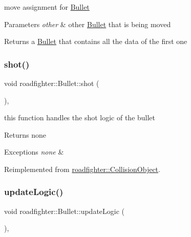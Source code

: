 move assignment for \hyperlink{classroadfighter_1_1Bullet}{Bullet} 
\begin{DoxyParams}{Parameters}
{\em other} & other \hyperlink{classroadfighter_1_1Bullet}{Bullet} that is being moved \\
\hline
\end{DoxyParams}
\begin{DoxyReturn}{Returns}
a \hyperlink{classroadfighter_1_1Bullet}{Bullet} that contains all the data of the first one 
\end{DoxyReturn}
\mbox{\label{classroadfighter_1_1Bullet_acaacd303f1f4e55c5029d4a4cbe1d9b1}} 
\subsubsection{\texorpdfstring{shot()}{shot()}}
{\footnotesize\ttfamily void roadfighter\+::\+Bullet\+::shot (\begin{DoxyParamCaption}{ }\end{DoxyParamCaption})\hspace{0.3cm}{\ttfamily [override]}, {\ttfamily [virtual]}}

this function handles the shot logic of the bullet \begin{DoxyReturn}{Returns}
none 
\end{DoxyReturn}

\begin{DoxyExceptions}{Exceptions}
{\em none} & \\
\hline
\end{DoxyExceptions}


Reimplemented from \hyperlink{classroadfighter_1_1CollisionObject_a55d891b6d9b50abdc44f964a40a7777c}{roadfighter\+::\+Collision\+Object}.

\mbox{\label{classroadfighter_1_1Bullet_a13aa730279ee8590d0eb2f9e6c01f265}} 
\subsubsection{\texorpdfstring{update\+Logic()}{updateLogic()}}
{\footnotesize\ttfamily void roadfighter\+::\+Bullet\+::update\+Logic (\begin{DoxyParamCaption}{ }\end{DoxyParamCaption})\hspace{0.3cm}{\ttfamily [override]}, {\ttfamily [virtual]}}

